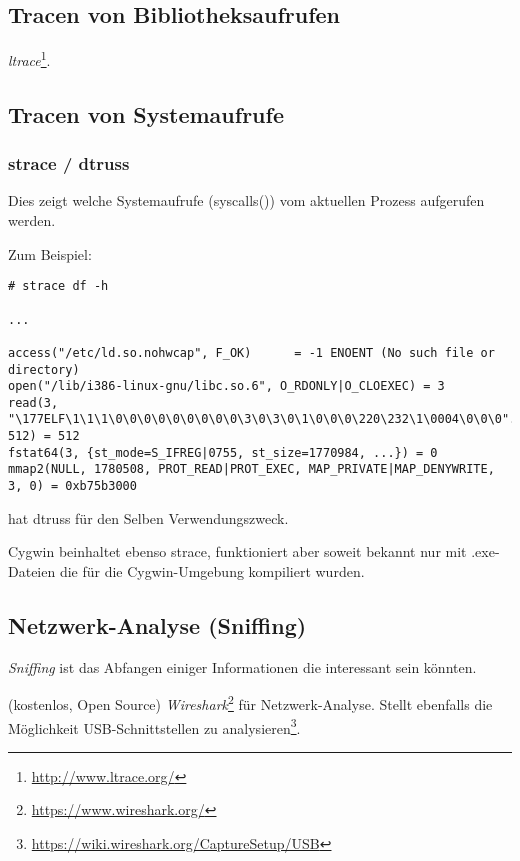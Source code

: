 \subsection{Tracen von Bibliotheksaufrufen}

\emph{ltrace}\footnote{\url{http://www.ltrace.org/}}.

\subsection{Tracen von Systemaufrufe}

\label{strace}
\subsubsection{strace / dtruss}

Dies zeigt welche Systemaufrufe (syscalls()) vom aktuellen Prozess aufgerufen werden.

Zum Beispiel:

\begin{lstlisting}
# strace df -h

...

access("/etc/ld.so.nohwcap", F_OK)      = -1 ENOENT (No such file or directory)
open("/lib/i386-linux-gnu/libc.so.6", O_RDONLY|O_CLOEXEC) = 3
read(3, "\177ELF\1\1\1\0\0\0\0\0\0\0\0\0\3\0\3\0\1\0\0\0\220\232\1\0004\0\0\0"..., 512) = 512
fstat64(3, {st_mode=S_IFREG|0755, st_size=1770984, ...}) = 0
mmap2(NULL, 1780508, PROT_READ|PROT_EXEC, MAP_PRIVATE|MAP_DENYWRITE, 3, 0) = 0xb75b3000
\end{lstlisting}

\myindex{\MacOSX}
\MacOSX hat dtruss für den Selben Verwendungszweck.

Cygwin beinhaltet ebenso strace, funktioniert aber soweit bekannt nur mit .exe-Dateien
die für die Cygwin-Umgebung kompiliert wurden.

\subsection{Netzwerk-Analyse (Sniffing)}

\emph{Sniffing} ist das Abfangen einiger Informationen die interessant sein könnten.

(kostenlos, Open Source) \emph{Wireshark}\footnote{\url{https://www.wireshark.org/}} für Netzwerk-Analyse.
Stellt ebenfalls die Möglichkeit USB-Schnittstellen zu analysieren\footnote{\url{https://wiki.wireshark.org/CaptureSetup/USB}}.

